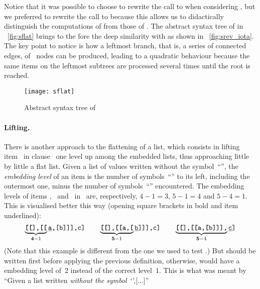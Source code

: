 Notice that it was possible to choose to rewrite the call to
 when considering
, but we preferred to rewrite
the call to  because this allows us to didactically
distinguish the computations of from those
of . The abstract syntax tree of
 in \fig~\vref{fig:sflat} brings to
the fore the deep similarity with  as shown in
\fig~\vref{fig:srev_iota}. The key point to notice is how a leftmost
branch, that is, a series of connected edges, of ~nodes
can be produced, leading to a quadratic behaviour because the same
items on the leftmost subtrees are processed several times until the
root is reached.
\begin{figure}[h]
\centering
\texttt{[image: sflat]}%
\caption{Abstract syntax tree of 
\label{fig:sflat}}
\end{figure}


\paragraph{Lifting.}

There is another approach to the flattening of a list, which consists
in lifting item~ in clause~\clause{\gamma} one level up
among the embedded lists, thus approaching little by little a flat
list. Given a list of values written without the
symbol~``\erlcode{|}'', the \emph{embedding level} of an item is the
number of symbols~``\erlcode{[}'' to its left, including the outermost
  one, minus the number of symbols~``\erlcode{]}'' encountered. The
embedding levels of items , ~and~
in~ are, respectively, \(4-1=3\), \(5-1=4\)
and \(5-4=1\). This is visualised better this way (opening square
brackets in bold and item underlined):
\begin{equation*}
\underbrace{\texttt{\textbf{[[}],\textbf{[[}}}_{\textbf{4}-1}\texttt{\underline{a},[b]]],c]}\qquad
\underbrace{\texttt{\textbf{[[}],\textbf{[[}a,\textbf{[}}}_{\textbf{5}-1}\texttt{\underline{b}]]],c]}\qquad
\underbrace{\texttt{\textbf{[[}],\textbf{[[}a,\textbf{[}b]]],}}_{\textbf{5}-4}\texttt{\underline{c}]}
\end{equation*}
(Note that this example is different from the one we used to test
.) But  should be written
\erlcode{[a,b]} first before applying the previous definition,
otherwise,  would have a embedding level of~\(2\) instead
of the correct level~\(1\). This is what was meant by ``Given a list
written \emph{without the symbol \emph{`\erlcode{|}'}},[...]''

